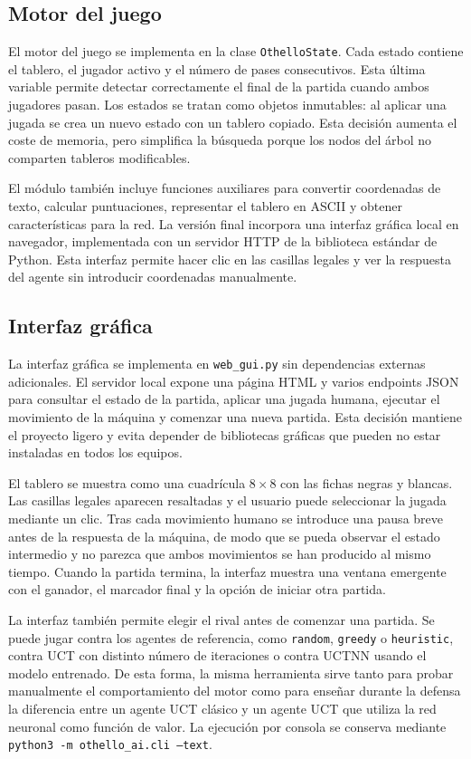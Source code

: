 \documentclass[conference,a4paper]{IEEEtran}
\begin{document}
\subsection{Motor del juego}

El motor del juego se implementa en la clase \texttt{OthelloState}. Cada estado
contiene el tablero, el jugador activo y el número de pases consecutivos. Esta
última variable permite detectar correctamente el final de la partida cuando
ambos jugadores pasan. Los estados se tratan como objetos inmutables: al aplicar
una jugada se crea un nuevo estado con un tablero copiado. Esta decisión aumenta
el coste de memoria, pero simplifica la búsqueda porque los nodos del árbol no
comparten tableros modificables.

El módulo también incluye funciones auxiliares para convertir coordenadas de
texto, calcular puntuaciones, representar el tablero en ASCII y obtener
características para la red. La versión final incorpora una interfaz gráfica
local en navegador, implementada con un servidor HTTP de la biblioteca estándar
de Python. Esta interfaz permite hacer clic en las casillas legales y ver la
respuesta del agente sin introducir coordenadas manualmente.

\subsection{Interfaz gráfica}

La interfaz gráfica se implementa en \texttt{web\_gui.py} sin dependencias
externas adicionales. El servidor local expone una página HTML y varios
endpoints JSON para consultar el estado de la partida, aplicar una jugada
humana, ejecutar el movimiento de la máquina y comenzar una nueva partida. Esta
decisión mantiene el proyecto ligero y evita depender de bibliotecas gráficas
que pueden no estar instaladas en todos los equipos.

El tablero se muestra como una cuadrícula \(8 \times 8\) con las fichas negras y
blancas. Las casillas legales aparecen resaltadas y el usuario puede seleccionar
la jugada mediante un clic. Tras cada movimiento humano se introduce una pausa
breve antes de la respuesta de la máquina, de modo que se pueda observar el
estado intermedio y no parezca que ambos movimientos se han producido al mismo
tiempo. Cuando la partida termina, la interfaz muestra una ventana emergente con
el ganador, el marcador final y la opción de iniciar otra partida.

La interfaz también permite elegir el rival antes de comenzar una partida. Se
puede jugar contra los agentes de referencia, como \texttt{random},
\texttt{greedy} o \texttt{heuristic}, contra UCT con distinto número de
iteraciones o contra UCTNN usando el modelo entrenado. De esta forma, la misma
herramienta sirve tanto para probar manualmente el comportamiento del motor como
para enseñar durante la defensa la diferencia entre un agente UCT clásico y un
agente UCT que utiliza la red neuronal como función de valor. La ejecución por
consola se conserva mediante \texttt{python3 -m othello\_ai.cli --text}.
\end{document}
